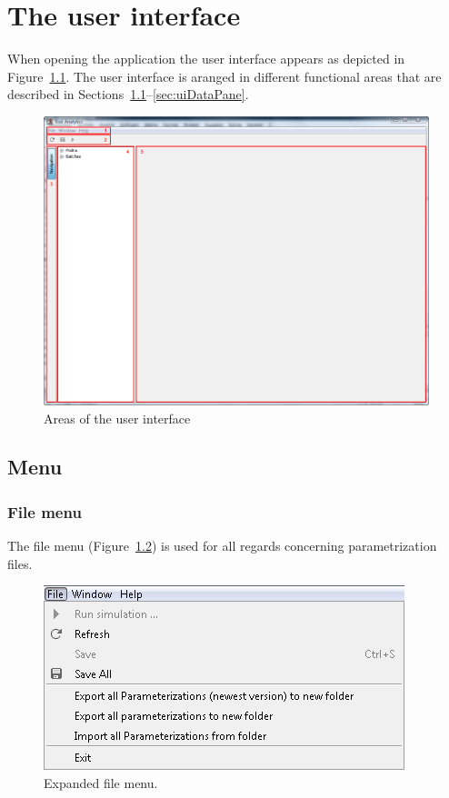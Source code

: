 \chapter{The user interface}
\label{chap:userinterface}

When opening the \RA{} application the user interface appears as depicted in Figure~\ref{fig:UserInterfaceAreas}. The user interface is aranged in different functional areas that are described in Sections~\ref{sec:uiMenu}--\ref{sec:uiDataPane}.


\begin{figure}[htb]
	\centering
		\includegraphics[scale=0.6]{images/UserInterfaceAreas.png}
	\caption{Areas of the user interface}
	\label{fig:UserInterfaceAreas}
\end{figure}


\section{Menu}
\label{sec:uiMenu}

\subsection{File menu}
\label{subsec:uiFileMenu}

The file menu (\cf Figure~\ref{fig:menuFile}) is used for all regards concerning parametrization files. 

\begin{figure}[htb]
	\centering
		\includegraphics[scale=0.6]{images/menuFile.png}
	\caption{Expanded file menu.}
	\label{fig:menuFile}
\end{figure}

